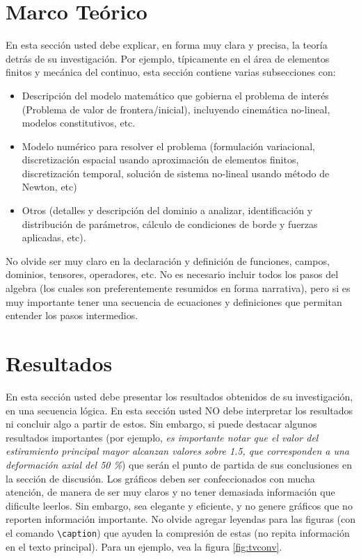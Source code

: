 \documentclass[12pt, letterpaper]{article}
\begin{document}
\section{Marco Te\'orico}
En esta secci\'on usted debe explicar, en forma muy clara y precisa, la teor\'ia detr\'as de su investigaci\'on. Por ejemplo, t\'ipicamente en el \'area de elementos finitos y mec\'anica del continuo, esta secci\'on contiene varias subsecciones con:
\begin{itemize}
	\item Descripci\'on del modelo matem\'atico que gobierna el problema de inter\'es (Problema de valor de frontera/inicial), incluyendo cinem\'atica no-lineal, modelos constitutivos, etc.
	\item Modelo num\'erico para resolver el problema (formulaci\'on variacional, discretizaci\'on espacial usando aproximaci\'on de elementos finitos, discretizaci\'on temporal, soluci\'on de sistema no-lineal usando m\'etodo de Newton, etc)
	\item Otros (detalles y descripci\'on del dominio a analizar, identificaci\'on y distribuci\'on de par\'ametros, c\'alculo de condiciones de borde y fuerzas aplicadas, etc).
\end{itemize}
No olvide ser muy claro en la declaraci\'on y definici\'on de funciones, campos, dominios, tensores, operadores, etc. No es necesario incluir todos los pasos del algebra (los cuales son preferentemente resumidos en forma narrativa), pero si es muy importante tener una secuencia de ecuaciones y definiciones que permitan entender los pasos intermedios.

\section{Resultados}
En esta secci\'on usted debe presentar los resultados obtenidos de su investigaci\'on, en una secuencia l\'ogica. En esta secci\'on usted NO debe interpretar los resultados ni concluir algo a partir de estos. Sin embargo, si puede destacar algunos resultados importantes (por ejemplo, {\it es importante notar que el valor del estiramiento principal mayor alcanzan valores sobre 1.5, que corresponden a una deformaci\'on axial del 50 \%}) que ser\'an el punto de partida de sus conclusiones en la secci\'on de discusi\'on. Los gr\'aficos deben ser confeccionados con mucha atenci\'on, de manera de ser muy claros y no tener demasiada informaci\'on que dificulte leerlos. Sin embargo, sea elegante y eficiente, y no genere gr\'aficos que no reporten informaci\'on importante. No olvide agregar leyendas para las figuras (con el comando {\tt \textbackslash caption}) que ayuden la compresi\'on de estas (no repita informaci\'on en el texto principal). Para un ejemplo, vea la figura \ref{fig:tvconv}.
\end{document}
